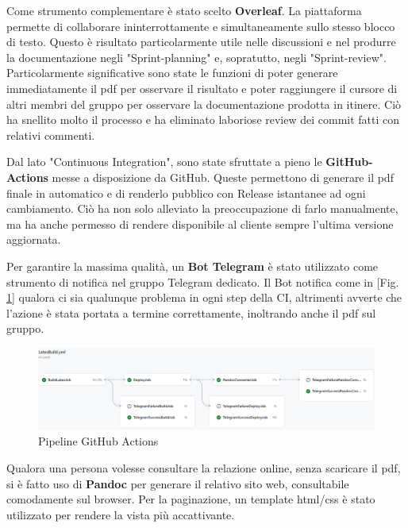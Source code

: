         Come strumento complementare è stato scelto \textbf{Overleaf}. La piattaforma permette di collaborare ininterrottamente e simultaneamente sullo stesso blocco di testo. Questo è risultato particolarmente utile nelle discussioni e nel produrre la documentazione negli "Sprint-planning" e, sopratutto, negli "Sprint-review". Particolarmente significative sono state le funzioni di poter generare immediatamente il pdf per osservare il risultato e poter raggiungere il cursore di altri membri del gruppo per osservare la documentazione prodotta in itinere. Ciò ha snellito molto il processo e ha eliminato laboriose review dei commit fatti con relativi commenti.  

        Dal lato "Continuous Integration", sono state sfruttate a pieno le \textbf{GitHub-Actions} messe a disposizione da GitHub. Queste permettono di generare il pdf finale in automatico e di renderlo pubblico con Release istantanee ad ogni cambiamento. Ciò ha non solo alleviato la preoccupazione di farlo manualmente, ma ha anche permesso di rendere disponibile al cliente sempre l'ultima versione aggiornata. 

        Per garantire la massima qualità, un \textbf{Bot Telegram} è stato utilizzato come strumento di notifica nel gruppo Telegram dedicato. Il Bot notifica come in [Fig. \ref{fig:ci-github}] qualora ci sia qualunque problema in ogni step della CI, altrimenti avverte che l'azione è stata portata a termine correttamente, inoltrando anche il pdf sul gruppo. 

        \begin{figure}[H]
            \caption{Pipeline GitHub Actions}
            \label{fig:ci-github}
            \centering
            \includegraphics[width=1\textwidth]{Images/gh-pipeline.png}
        \end{figure}

        Qualora una persona volesse consultare la relazione online, senza scaricare il pdf, si è fatto uso di \textbf{Pandoc} per generare il relativo sito web, consultabile comodamente sul browser. Per la paginazione, un template html/css è stato utilizzato per rendere la vista più accattivante.

